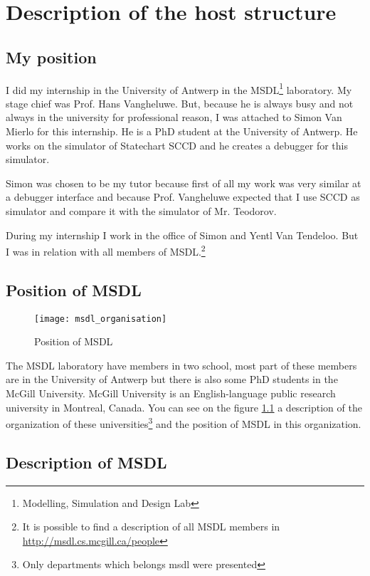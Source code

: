 
\chapter{Description of the host structure}


\section{My position}

I did my internship in the University of Antwerp in the MSDL\footnote{Modelling, Simulation and Design Lab} laboratory. My stage chief was Prof. Hans Vangheluwe. But, because he is always busy and not always in the university for professional reason, I was attached to Simon Van Mierlo for this internship. He is a PhD student at the University of Antwerp. He works on the simulator of Statechart SCCD and he creates a debugger for this simulator.

Simon was chosen to be my tutor because first of all my work was very similar at a debugger interface and because Prof. Vangheluwe expected that I use SCCD as simulator and compare it with the simulator of Mr. Teodorov.

During my internship I work in the office of Simon and Yentl Van Tendeloo. But I was in relation with all members of MSDL.\footnote{It is possible to find a description of all MSDL members in \url{http://msdl.cs.mcgill.ca/people}}



\section{Position of MSDL}

\begin{figure}[h]
  \centering
  \texttt{[image: msdl\_organisation]}

  \caption{Position of MSDL}
  \label{fig:msdl_org}
\end{figure}

The MSDL laboratory have members in two school, most part of these members are in the University of Antwerp but there is also some PhD students in the McGill University. McGill University is an English-language public research university in Montreal, Canada. You can see on the figure \ref{fig:msdl_org} a description of the organization of these universities\footnote{Only departments which belongs msdl were presented} and the position of MSDL in this organization.


\section{Description of MSDL}


